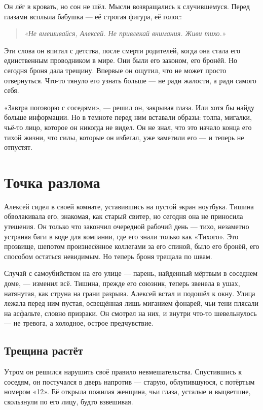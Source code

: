\documentclass[12pt,a4paper]{book}
\newenvironment{innerthought}{\begin{quote}\small\itshape}{\end{quote}}
\begin{document}
Он лёг в кровать, но сон не шёл. Мысли возвращались к случившемуся. Перед глазами всплыла бабушка --- её строгая фигура, её голос:

\begin{innerthought}
«Не вмешивайся, Алексей. Не привлекай внимания. Живи тихо.»
\end{innerthought}

Эти слова он впитал с детства, после смерти родителей, когда она стала его единственным проводником в мире. Они были его законом, его бронёй. Но сегодня броня дала трещину. Впервые он ощутил, что не может просто отвернуться. Что-то тянуло его узнать больше --- не ради жалости, а ради самого себя.

«Завтра поговорю с соседями», --- решил он, закрывая глаза. Или хотя бы найду больше информации. Но в темноте перед ним вставали образы: толпа, мигалки, чьё-то лицо, которое он никогда не видел. Он не знал, что это начало конца его тихой жизни, что силы, которые он избегал, уже заметили его --- и теперь не отпустят.

\chapter{Точка разлома}

Алексей сидел в своей комнате, уставившись на пустой экран ноутбука. Тишина обволакивала его, знакомая, как старый свитер, но сегодня она не приносила утешения. Он только что закончил очередной рабочий день --- тихо, незаметно устраняя баги в коде для компании, где его знали только как «Тихого». Это прозвище, шепотом произнесённое коллегами за его спиной, было его бронёй, его способом остаться невидимым. Но теперь броня трещала по швам.

Случай с самоубийством на его улице — парень, найденный мёртвым в соседнем доме, — изменил всё. Тишина, прежде его союзник, теперь звенела в ушах, натянутая, как струна на грани разрыва. Алексей встал и подошёл к окну. Улица лежала перед ним пустая, освещённая лишь миганием фонарей, чьи тени плясали на асфальте, словно призраки. Он смотрел на них, и внутри что-то шевельнулось — не тревога, а холодное, острое предчувствие.

\section{Трещина растёт}

Утром он решился нарушить своё правило невмешательства. Спустившись к соседям, он постучался в дверь напротив — старую, облупившуюся, с потёртым номером «12». Её открыла пожилая женщина, чьи глаза, усталые и выцветшие, скользнули по его лицу, будто взвешивая.
\end{document}
